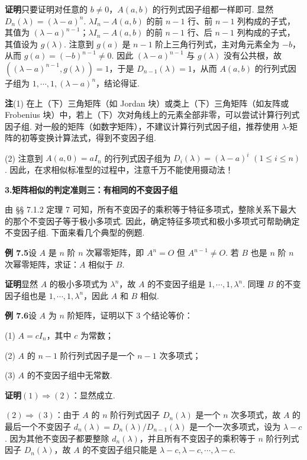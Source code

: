 \documentclass[UTF8,12pt,a4paper,fontset=fandol]{ctexart}
\begin{document}
\noindent\textbf{证明}\quad 只要证明对任意的 $b\ne 0$，$A(a,b)$ 的行列式因子组都一样即可. 显然 $D_n(\lambda)=(\lambda-a)^n$. $\lambda I_n-A(a,b)$ 的前 $n-1$ 行、前 $n-1$ 列构成的子式，其值为 $(\lambda-a)^{n-1}$；$\lambda I_n-A(a,b)$ 的前 $n-1$ 行、后 $n-1$ 列构成的子式，其值设为 $g(\lambda)$. 注意到 $g(a)$ 是 $n-1$ 阶上三角行列式，主对角元素全为 $-b$，从而 $g(a)=(-b)^{n-1}\ne 0$. 因此 $(\lambda-a)^{n-1}$ 与 $g(\lambda)$ 没有公共根，故 $((\lambda-a)^{n-1},g(\lambda))=1$，于是 $D_{n-1}(\lambda)=1$，从而 $A(a,b)$ 的行列式因子组为 $1,\cdots,1,(\lambda-a)^n$，结论得证.

\noindent\textbf{注}\quad (1) 在上（下）三角矩阵（如 Jordan 块）或类上（下）三角矩阵（如友阵或 Frobenius 块）中，若上（下）次对角线上的元素全部非零，可以尝试计算行列式因子组. 对一般的矩阵（如数字矩阵），不建议计算行列式因子组，推荐使用 $\lambda$-矩阵的初等变换计算法式，得到不变因子组.

(2) 注意到 $A(a,0)=aI_n$ 的行列式因子组为 $D_i(\lambda)=(\lambda-a)^i$ $(1\le i\le n)$. 因此，在求相似标准型的过程中，注意千万不能使用摄动法！

\noindent\textbf{3.\quad 矩阵相似的判定准则三：有相同的不变因子组}

由 §§ 7.1.2 定理 7 可知，所有不变因子的乘积等于特征多项式，整除关系下最大的那个不变因子等于极小多项式. 因此，确定特征多项式和极小多项式可帮助确定不变因子组. 下面来看几个典型的例题.

\noindent\textbf{例 7.5}\quad 设 $A$ 是 $n$ 阶 $n$ 次幂零矩阵，即 $A^n=O$ 但 $A^{n-1}\ne O$. 若 $B$ 也是 $n$ 阶 $n$ 次幂零矩阵，求证：$A$ 相似于 $B$.

\noindent\textbf{证明}\quad 显然 $A$ 的极小多项式为 $\lambda^n$，故 $A$ 的不变因子组是 $1,\cdots,1,\lambda^n$. 同理 $B$ 的不变因子组也是 $1,\cdots,1,\lambda^n$，因此 $A$ 和 $B$ 相似.

\noindent\textbf{例 7.6}\quad 设 $A$ 为 $n$ 阶矩阵，证明以下 3 个结论等价：

(1) $A=cI_n$，其中 $c$ 为常数；

(2) $A$ 的 $n-1$ 阶行列式因子是一个 $n-1$ 次多项式；

(3) $A$ 的不变因子组中无常数.

\noindent\textbf{证明}\quad $(1)\Rightarrow(2)$：显然成立.

$(2)\Rightarrow(3)$：由于 $A$ 的 $n$ 阶行列式因子 $D_n(\lambda)$ 是一个 $n$ 次多项式，故 $A$ 的最后一个不变因子 $d_n(\lambda)=D_n(\lambda)/D_{n-1}(\lambda)$ 是一个一次多项式，设为 $\lambda-c$. 因为其他不变因子都要整除 $d_n(\lambda)$，并且所有不变因子的乘积等于 $n$ 阶行列式因子 $D_n(\lambda)$，故 $A$ 的不变因子组只能是 $\lambda-c,\lambda-c,\cdots,\lambda-c$.
\end{document}
